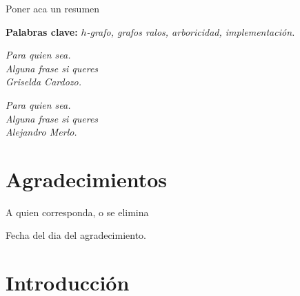 \documentclass[%
    a4paper,%
    12pt,%
    twoside,%
    openright,%
    halfparskip,%
    cleardoubleempty,%
    bigheadings,%
    titlepage,%
    headsepline%
]{scrbook}
\begin{document}
Poner aca un resumen

\noindent \textbf{Palabras clave:} \textit{$h$-grafo, grafos ralos, arboricidad, implementación.}

\newpage
\thispagestyle{empty} \cleardoublepage




{\raggedleft\emph{Para quien sea.\\ Alguna frase si queres\\Griselda Cardozo.}\par
            \emph{Para quien sea.\\ Alguna frase si queres\\Alejandro Merlo.}\par}

\thispagestyle{empty} \cleardoublepage

\chapter*{Agradecimientos}

A quien corresponda, o se elimina

 Fecha del dia del agradecimiento.

\thispagestyle{empty} \cleardoublepage

\tableofcontents

\mainmatter

\chapter{Introducción}
\label{sec:introduccion}
\end{document}
